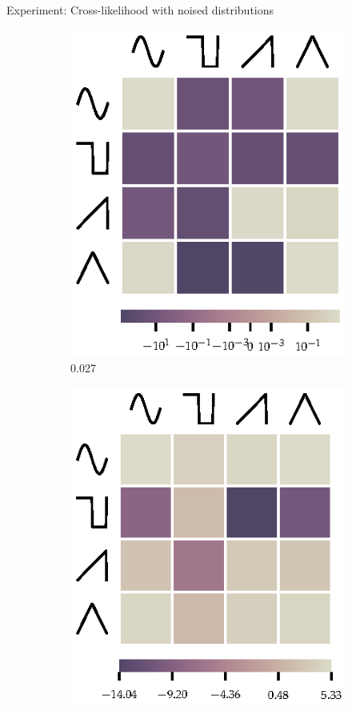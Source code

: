 \documentclass{beamer}
\begin{document}
\begin{frame}{Experiment: Cross-likelihood with noised distributions}
\begin{figure}
\begin{subfigure}{0.3\textwidth}
                \includegraphics[width=\textwidth]{toy_noise_027/channels_hm.eps}%
                \caption{0.027}
            \end{subfigure}%
            \begin{subfigure}{0.3\textwidth}
                \includegraphics[width=\textwidth]{toy_noise_129/channels_hm.eps}%

\end{subfigure}
\end{figure}
\end{frame}
\end{document}
